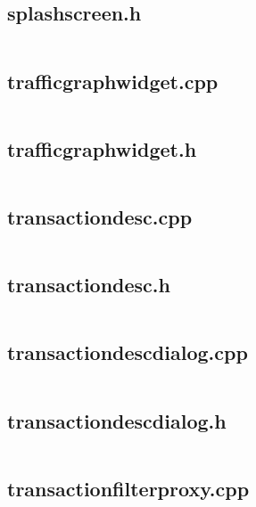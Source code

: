\documentclass{article}
\begin{document}
\subsection{splashscreen.h}
\inputminted{cpp}{/home/dufferzafar/dev/@clones/bitcoin/src/qt/splashscreen.h}
\newpage

\subsection{trafficgraphwidget.cpp}
\inputminted{cpp}{/home/dufferzafar/dev/@clones/bitcoin/src/qt/trafficgraphwidget.cpp}
\newpage

\subsection{trafficgraphwidget.h}
\inputminted{cpp}{/home/dufferzafar/dev/@clones/bitcoin/src/qt/trafficgraphwidget.h}
\newpage

\subsection{transactiondesc.cpp}
\inputminted{cpp}{/home/dufferzafar/dev/@clones/bitcoin/src/qt/transactiondesc.cpp}
\newpage

\subsection{transactiondesc.h}
\inputminted{cpp}{/home/dufferzafar/dev/@clones/bitcoin/src/qt/transactiondesc.h}
\newpage

\subsection{transactiondescdialog.cpp}
\inputminted{cpp}{/home/dufferzafar/dev/@clones/bitcoin/src/qt/transactiondescdialog.cpp}
\newpage

\subsection{transactiondescdialog.h}
\inputminted{cpp}{/home/dufferzafar/dev/@clones/bitcoin/src/qt/transactiondescdialog.h}
\newpage

\subsection{transactionfilterproxy.cpp}
\inputminted{cpp}{/home/dufferzafar/dev/@clones/bitcoin/src/qt/transactionfilterproxy.cpp}
\newpage
\end{document}
